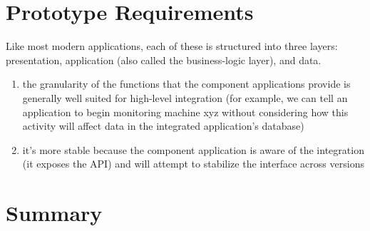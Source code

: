 \section{Prototype Requirements}
Like most modern applications, each of these is structured into three layers: presentation, 
application (also called the business-logic layer), and data.
\begin{enumerate}
\item the granularity of the functions that the component applications provide is generally well
suited for high-level integration (for example, we can tell an application to begin monitoring
machine xyz without considering how this activity will affect data in the integrated application’s database)
\item it’s more stable because the component application is aware of the integration (it exposes
the API) and will attempt to stabilize the interface across versions
\end{enumerate}

\section{Summary}
